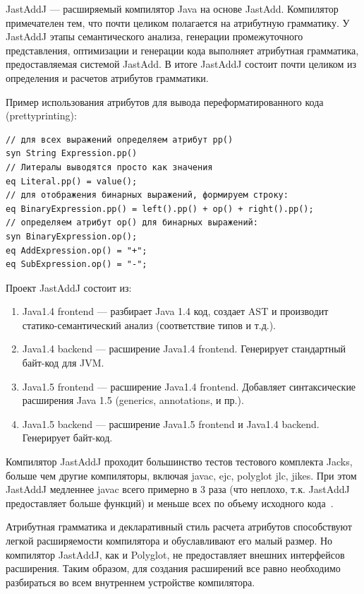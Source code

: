 \documentclass[a4paper,12pt,titlepage]{extarticle}
\begin{document}
JastAddJ --- расширяемый компилятор Java на основе JastAdd. Компилятор
примечателен тем, что почти целиком полагается на атрибутную грамматику. У
JastAddJ этапы семантического анализа, генерации промежуточного представления,
оптимизации и генерации кода выполняет атрибутная грамматика, предоставляемая
системой JastAdd. В итоге JastAddJ состоит почти целиком из определения и
расчетов атрибутов грамматики.

Пример использования атрибутов для вывода переформатированного кода
(prettyprinting):
\begin{verbatim}
// для всех выражений определяем атрибут pp()
syn String Expression.pp()
// Литералы выводятся просто как значения
eq Literal.pp() = value();
// для отображения бинарных выражений, формируем строку:
eq BinaryExpression.pp() = left().pp() + op() + right().pp();
// определяем атрибут op() для бинарных выражений:
syn BinaryExpression.op();
eq AddExpression.op() = "+";
eq SubExpression.op() = "-";
\end{verbatim}

Проект JastAddJ состоит из:
\begin{enumerate}
  \item Java1.4 frontend --- разбирает Java 1.4 код, создает AST и производит
  статико-семантический анализ (соответствие типов и т.д.).
  \item Java1.4 backend --- расширение Java1.4 frontend. Генерирует стандартный байт-код
  для JVM.
  \item Java1.5 frontend --- расширение Java1.4 frontend. Добавляет синтаксические
  расширения Java 1.5 (generics, annotations, и пр.).
  \item Java1.5 backend --- расширение Java1.5 frontend и Java1.4 backend. Генерирует
  байт-код.
\end{enumerate}

Компилятор JastAddJ проходит большинство тестов тестового комплекта Jacks,
больше чем другие компиляторы, включая javac, ejc, polyglot jlc, jikes. При
этом JastAddJ медленнее javac всего примерно в 3 раза (что неплохо, т.к.
JastAddJ предоставляет больше функций) и меньше всех по объему исходного
кода~\cite{JastAddJ}.

Атрибутная грамматика и декларативный стиль расчета атрибутов способствуют
легкой расширяемости компилятора и обуславливают его малый размер. Но
компилятор JastAddJ, как и Polyglot, не предоставляет внешних интерфейсов
расширения. Таким образом, для создания расширений все равно необходимо
разбираться во всем внутреннем устройстве компилятора.
\end{document}
